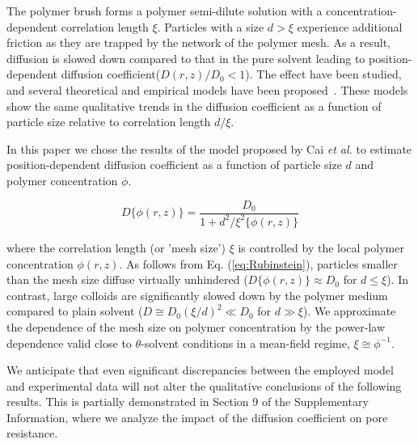\documentclass[12pt, a4paper]{article}
\begin{document}
The polymer brush forms a polymer semi-dilute solution with a concentration-dependent correlation length $\xi$.
Particles with a size $d > \xi$ experience additional friction as they are trapped by the network of the polymer mesh.
As a result, diffusion is slowed down compared to that in the pure solvent leading to position-dependent diffusion coefficient($D(r,z)/D_0 < 1$).
The effect have been studied, and several theoretical and empirical models have been proposed~\cite{Kohli2012,Cai2011,Holyst2009,Phillies1988}.
These models show the same qualitative trends in the diffusion coefficient as a function of particle size relative to  correlation length $d / \xi$.


In this paper we chose the results of the model proposed by Cai \emph{et al.} \cite{Cai2011} to estimate position-dependent diffusion coefficient as a function of particle size $d$ and polymer concentration $\phi$.

\begin{equation}
    D\{\phi(r,z)\} = \frac{D_0}{1+d^2/\xi^{2}\{\phi(r,z)\}}
    \label{eq:Rubinstein}
\end{equation}

\noindent where the correlation length (or 'mesh size') $\xi$ is controlled by the local polymer concentration $\phi(r,z)$. 
As follows from Eq. (\ref{eq:Rubinstein}), particles smaller than the mesh size diffuse virtually unhindered ($D\{\phi(r,z)\}\approx D_0$ for $d\leq \xi$). 
In contrast, large colloids are significantly slowed down by the polymer medium compared to plain solvent ($D\cong D_0 (\xi/d)^2\ll D_0$ for $d\gg \xi$). 
We approximate the dependence of the mesh size on polymer concentration by the power-law dependence valid close to $\theta$-solvent conditions in a mean-field regime, $\xi\cong \phi^{-1}$. 

We anticipate that even significant discrepancies between the employed model and experimental data will not alter the qualitative conclusions of the following results. 
This is partially demonstrated in Section 9 of the Supplementary Information, where we analyze the impact of the diffusion coefficient on pore resistance.


\end{document}
